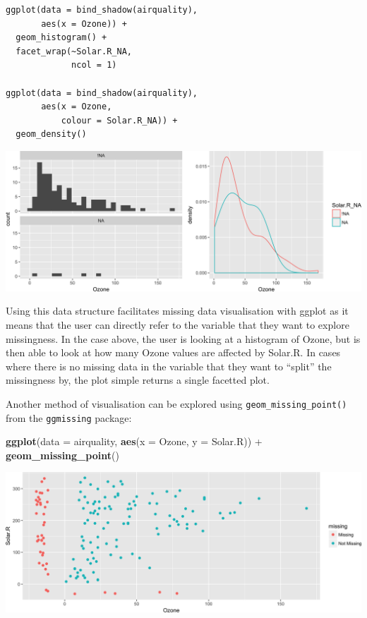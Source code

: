 \documentclass[]{article}
\newenvironment{Shaded}{\begin{snugshade}}{\end{snugshade}}
\newcommand{\KeywordTok}[1]{\textcolor[rgb]{0.13,0.29,0.53}{\textbf{{#1}}}}
\newcommand{\DataTypeTok}[1]{\textcolor[rgb]{0.13,0.29,0.53}{{#1}}}
\newcommand{\StringTok}[1]{\textcolor[rgb]{0.31,0.60,0.02}{{#1}}}
\newcommand{\NormalTok}[1]{{#1}}
\begin{document}
\begin{verbatim}
ggplot(data = bind_shadow(airquality),
       aes(x = Ozone)) + 
  geom_histogram() + 
  facet_wrap(~Solar.R_NA,
             ncol = 1)

ggplot(data = bind_shadow(airquality),
       aes(x = Ozone,
           colour = Solar.R_NA)) + 
  geom_density()
\end{verbatim}

\includegraphics{jsm2017_files/figure-latex/bind-shadow-density-1.png}

Using this data structure facilitates missing data visualisation with
ggplot as it means that the user can directly refer to the variable that
they want to explore missingness. In the case above, the user is looking
at a histogram of Ozone, but is then able to look at how many Ozone
values are affected by Solar.R. In cases where there is no missing data
in the variable that they want to ``split'' the missingness by, the plot
simple returns a single facetted plot.

Another method of visualisation can be explored using
\texttt{geom\_missing\_point()} from the \texttt{ggmissing} package:

\begin{Shaded}
\begin{Highlighting}[]
\KeywordTok{ggplot}\NormalTok{(}\DataTypeTok{data =} \NormalTok{airquality,}
       \KeywordTok{aes}\NormalTok{(}\DataTypeTok{x =} \NormalTok{Ozone,}
           \DataTypeTok{y =} \NormalTok{Solar.R)) +}\StringTok{ }
\StringTok{  }\KeywordTok{geom_missing_point}\NormalTok{()}
\end{Highlighting}
\end{Shaded}

\includegraphics{jsm2017_files/figure-latex/ggeom_missing-1.png}
\end{document}
